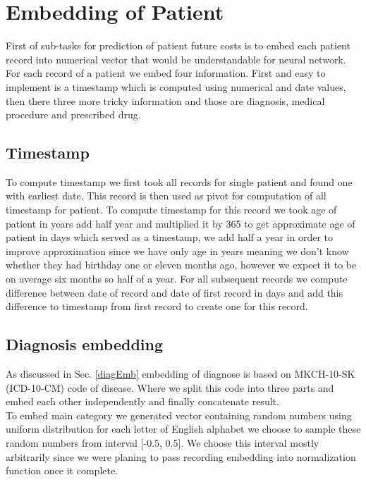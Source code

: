 
\section{Embedding of Patient}
\label{embeddingImple}

First of sub-tasks for prediction of patient future costs is to embed each patient record into numerical vector that would be understandable for neural network. For each record of a patient we embed four information. First and easy to implement is a timestamp which is computed using numerical and date values, then there three more tricky information and those are diagnosis, medical procedure and prescribed drug. 

\subsection{Timestamp}
\label{timespampImple}

To compute timestamp we first took all records for single patient and found one with earliest date. This record is then used as pivot for computation of all timestamp for patient. To compute timestamp for this record we took age of patient in years add half year and multiplied it by 365 to get approximate age of patient in days which served as a timestamp, we add half a year in order to improve approximation since we have only age in years meaning we don't know whether they had birthday one or eleven months ago, however we expect it to be on average six months so half of a year. For all subsequent records we compute difference between date of record and date of first record in days and add this difference to timestamp from first record to create one for this record. 

\subsection{Diagnosis embedding}

As discussed in Sec. \ref{diagEmb} embedding of diagnose is based on MKCH-10-SK (ICD-10-CM) code of disease. Where we split this code into three parts and embed each other independently and finally concatenate result.
\\

To embed main category we generated vector containing random numbers using uniform distribution for each letter of English alphabet we choose to sample these random numbers from interval [-0.5, 0.5]. We choose this interval mostly arbitrarily since we were planing to pass recording embedding into normalization function once it complete.
\\

